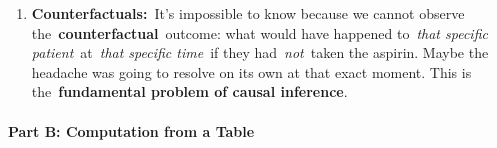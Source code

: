 \documentclass[
  10pt,
  letterpaper,
  DIV=11,
  numbers=noendperiod]{scrartcl}
\makeatletter
\let\oldparagraph\paragraph
\renewcommand{\paragraph}{
    \@ifstar
      \xxxParagraphStar
      \xxxParagraphNoStar
  }
\newcommand{\xxxParagraphStar}[1]{\oldparagraph*{#1}\mbox{}}
\newcommand{\xxxParagraphNoStar}[1]{\oldparagraph{#1}\mbox{}}
\makeatother
\begin{document}
\begin{enumerate}
\begin{itemize}
    \begin{itemize}
    \item
      Risk in unexposed = 40/100 = 0.40. Risk in exposed = 30/100 =
      0.30.
    \item
      \textbf{RR:}~0.30 / 0.40 =~\textbf{0.75}~(A 25\% risk reduction).
    \item
      \textbf{RD:}~0.30 - 0.40 =~\textbf{-0.10}~(Prevents 10 cases per
      100 people).
    \end{itemize}
  \item
    \textbf{Interpretation:}~The~\textbf{Risk Difference (RD)}~better
    reflects public health impact, as Intervention 2 prevents 5 times as
    many cases (10 vs.~2 per 100). The~\textbf{Risk Ratio (RR)}~better
    reflects the relative strength of the effect, as Intervention 1 cuts
    the risk in half, a stronger relative effect than the 25\% reduction
    from Intervention 2.
  \end{itemize}
\item
  \textbf{Counterfactuals:}~It's impossible to know because we cannot
  observe the~\textbf{counterfactual}~outcome: what would have happened
  to~\emph{that specific patient}~at~\emph{that specific time}~if they
  had~\emph{not}~taken the aspirin. Maybe the headache was going to
  resolve on its own at that exact moment. This is
  the~\textbf{fundamental problem of causal inference}.
\end{enumerate}

\paragraph{\texorpdfstring{\textbf{Part B: Computation from a
Table}}{Part B: Computation from a Table}}\label{part-b-computation-from-a-table-3}
\end{document}
